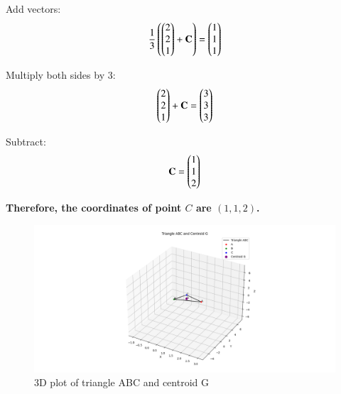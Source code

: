 \documentclass[journal]{IEEEtran}
\begin{document}
Add vectors:
\begin{align}
\frac{1}{3}\left(\begin{pmatrix}2\\2\\1\end{pmatrix} + \mathbf{C}\right) = \begin{pmatrix}1\\1\\1\end{pmatrix}
\end{align}

Multiply both sides by 3:
\begin{align}
\begin{pmatrix}2\\2\\1\end{pmatrix} + \mathbf{C} = \begin{pmatrix}3\\3\\3\end{pmatrix}
\end{align}

Subtract:
\begin{align}
\mathbf{C} = \begin{pmatrix}1\\1\\2\end{pmatrix}
\end{align}

\textbf{Therefore, the coordinates of point $C$ are $(1,1,2)$.}



\begin{figure}[h!]
   \centering
   \includegraphics[width=1\linewidth]{figs/fig1.png}
   \caption{3D plot of triangle ABC and centroid G}
   \label{}
\end{figure}
\end{document}
